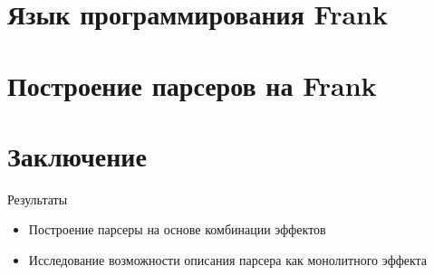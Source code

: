 
\section{Язык программирования Frank}




\section{Построение парсеров на Frank}






\section{Заключение}
\begin{frame}{Результаты}
  \begin{itemize}
    \item Построение парсеры на основе комбинации эффектов
    \item Исследование возможности описания парсера как монолитного эффекта
  \end{itemize}
\end{frame}


